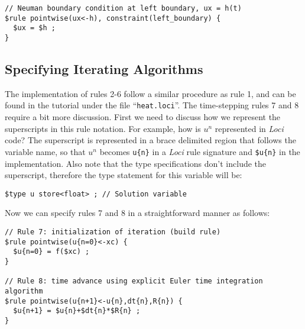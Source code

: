 \documentclass[10pt,epsf]{book}
\begin{document}
\begin{verbatim}
// Neuman boundary condition at left boundary, ux = h(t)
$rule pointwise(ux<-h), constraint(left_boundary) {
  $ux = $h ;
}
\end{verbatim}

\subsection{Specifying Iterating Algorithms}
The implementation of rules 2-6 follow a similar procedure as rule 1,
and can be found in the tutorial under the file ``{\tt heat.loci}''.
The time-stepping rules 7 and 8 require a bit more discussion.  First
we need to discuss how we represent the superscripts in this rule
notation.  For example, how is $u^n$ represented in {\it Loci} code?  The
superscript is represented in a brace delimited region that follows the
variable name, so that $u^n$ becomes {\tt u\{n\}} in a {\it Loci} rule
signature and {\tt \$u\{n\}} in the implementation. Also note that the
type specifications don't include the superscript, therefore the type
statement for this variable will be:
\begin{verbatim}
$type u store<float> ; // Solution variable
\end{verbatim}

Now we can specify rules 7 and 8 in a straightforward manner as follows:
\begin{verbatim}
// Rule 7: initialization of iteration (build rule)
$rule pointwise(u{n=0}<-xc) {
  $u{n=0} = f($xc) ;
}

// Rule 8: time advance using explicit Euler time integration algorithm
$rule pointwise(u{n+1}<-u{n},dt{n},R{n}) {
  $u{n+1} = $u{n}+$dt{n}*$R{n} ;
}
\end{verbatim}
\end{document}
